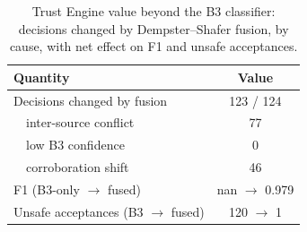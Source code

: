 \begin{table}[t]
\centering
\caption{Trust Engine value beyond the B3 classifier: decisions changed by Dempster--Shafer fusion, by cause, with net effect on F1 and unsafe acceptances.}
\label{tab:fusion}
\begin{tabular}{lc}
\toprule
Quantity & Value \\
\midrule
Decisions changed by fusion & 123 / 124 \\
\ \ inter-source conflict & 77 \\
\ \ low B3 confidence & 0 \\
\ \ corroboration shift & 46 \\
F1 (B3-only $\to$ fused) & nan $\to$ 0.979 \\
Unsafe acceptances (B3 $\to$ fused) & 120 $\to$ 1 \\
\bottomrule
\end{tabular}
\end{table}
